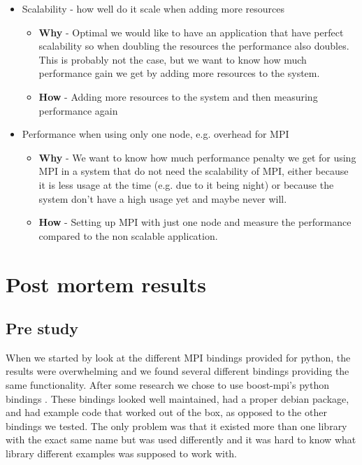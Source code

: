 \documentclass{article}
\begin{document}
\begin{itemize}
\begin{itemize}
{ performance we want to know how much we are able to increase it by using MPI. }
\item{ \textbf{How} - Measure the time to run the program with \emph{time}} (a UNIX command)
\end{itemize}
\item Scalability - how well do it scale when adding more resources
\begin{itemize}
\item{ \textbf{Why} - Optimal we would like to have an application that have
perfect scalability \cite{jogalekar2000evaluating} so when doubling the
resources the performance also doubles. This is probably not the case, but we
want to know how much performance gain we get by adding more resources to the
system. }


\item{ \textbf{How} - Adding more resources to the system and then measuring performance
 again}
\end{itemize}
\item Performance when using only one node, e.g. overhead for MPI
\begin{itemize}
\item{ \textbf{Why} - We want to know how much performance penalty we get for using
MPI in a system that do not need the scalability of MPI, either because it is 
less usage at the time (e.g. due to it being night) or because the system
don't have a high usage yet and maybe never will.}
\item{ \textbf{How} - Setting up MPI with just one node and measure the performance
 compared to the non scalable application. }
\end{itemize}
\end{itemize}


\section{Post mortem results}\label{mpi}
\subsection{Pre study}
When we started by look at the different MPI bindings provided for python, the
results were overwhelming and we found several different bindings providing the
same functionality. After some research we chose to use boost-mpi's python
bindings \cite{boost-mpi}. These bindings looked well maintained, had a proper
debian package, and had example code that worked out of the box, as opposed to
the other bindings we tested. The only problem was that it existed more than
one library with the exact same name but was used differently and it was hard
to know what library different examples was supposed to work with. 
\end{document}
